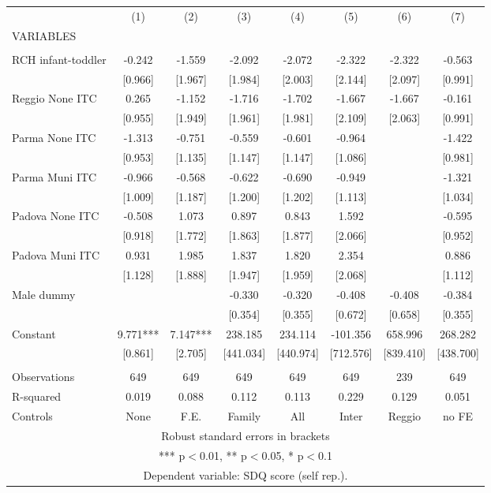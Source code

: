 \begin{tabular}{lccccccc} \hline
 & (1) & (2) & (3) & (4) & (5) & (6) & (7) \\
VARIABLES &  &  &  &  &  &  &  \\ \hline
 &  &  &  &  &  &  &  \\
RCH infant-toddler & -0.242 & -1.559 & -2.092 & -2.072 & -2.322 & -2.322 & -0.563 \\
 & [0.966] & [1.967] & [1.984] & [2.003] & [2.144] & [2.097] & [0.991] \\
Reggio None ITC & 0.265 & -1.152 & -1.716 & -1.702 & -1.667 & -1.667 & -0.161 \\
 & [0.955] & [1.949] & [1.961] & [1.981] & [2.109] & [2.063] & [0.991] \\
Parma None ITC & -1.313 & -0.751 & -0.559 & -0.601 & -0.964 &  & -1.422 \\
 & [0.953] & [1.135] & [1.147] & [1.147] & [1.086] &  & [0.981] \\
Parma Muni ITC & -0.966 & -0.568 & -0.622 & -0.690 & -0.949 &  & -1.321 \\
 & [1.009] & [1.187] & [1.200] & [1.202] & [1.113] &  & [1.034] \\
Padova None ITC & -0.508 & 1.073 & 0.897 & 0.843 & 1.592 &  & -0.595 \\
 & [0.918] & [1.772] & [1.863] & [1.877] & [2.066] &  & [0.952] \\
Padova Muni ITC & 0.931 & 1.985 & 1.837 & 1.820 & 2.354 &  & 0.886 \\
 & [1.128] & [1.888] & [1.947] & [1.959] & [2.068] &  & [1.112] \\
Male dummy &  &  & -0.330 & -0.320 & -0.408 & -0.408 & -0.384 \\
 &  &  & [0.354] & [0.355] & [0.672] & [0.658] & [0.355] \\
Constant & 9.771*** & 7.147*** & 238.185 & 234.114 & -101.356 & 658.996 & 268.282 \\
 & [0.861] & [2.705] & [441.034] & [440.974] & [712.576] & [839.410] & [438.700] \\
 &  &  &  &  &  &  &  \\
Observations & 649 & 649 & 649 & 649 & 649 & 239 & 649 \\
R-squared & 0.019 & 0.088 & 0.112 & 0.113 & 0.229 & 0.129 & 0.051 \\
 Controls & None & F.E. & Family & All & Inter & Reggio & no FE \\ \hline
\multicolumn{8}{c}{ Robust standard errors in brackets} \\
\multicolumn{8}{c}{ *** p$<$0.01, ** p$<$0.05, * p$<$0.1} \\
\multicolumn{8}{c}{ Dependent variable: SDQ score (self rep.).} \\
\end{tabular}
